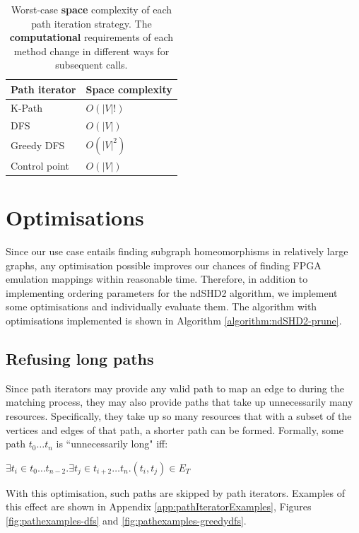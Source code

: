 \begin{table}
\centering
\begin{tabular}{|l|l|}
\hline
\textbf{Path iterator} & \textbf{Space complexity} \\ \hline
K-Path                 & $O(|V|!)$                 \\ \hline
DFS                    & $O(|V|)$                  \\ \hline
Greedy DFS             & $O(|V|^2)$                \\ \hline
Control point          & $O(|V|)$                  \\ \hline
\end{tabular}
\caption{Worst-case \textbf{space} complexity of each path iteration strategy. The \textbf{computational} requirements of each method change in different ways for subsequent calls.}
\label{tab:iterator-spacerequirements}
\end{table}


\section{Optimisations}
\label{sec:optimisations}
Since our use case entails finding subgraph homeomorphisms in relatively large graphs, any optimisation possible improves our chances of finding FPGA emulation mappings within reasonable time. Therefore, in addition to implementing ordering parameters for the ndSHD2 algorithm, we implement some optimisations and individually evaluate them. The algorithm with optimisations implemented is shown in Algorithm \ref{algorithm:ndSHD2-prune}.

\subsection{Refusing long paths}
\label{sec:refusinglongerpaths}
Since path iterators may provide any valid path to map an edge to during the matching process, they may also provide paths that take up unnecessarily many resources. Specifically, they take up so many resources that with a subset of the vertices and edges of that path, a shorter path can be formed. Formally, some path $t_0\dots t_n$ is ``unnecessarily long" iff:


$\exists t_i \in t_0\dots t_{n-2} . \exists t_j \in t_{i+2}\dots t_n . (t_i, t_j) \in E_T$

With this optimisation, such paths are skipped by path iterators. Examples of this effect are shown in Appendix \ref{app:pathIteratorExamples}, Figures \ref{fig:pathexamples-dfs}
 and \ref{fig:pathexamples-greedydfs}.

